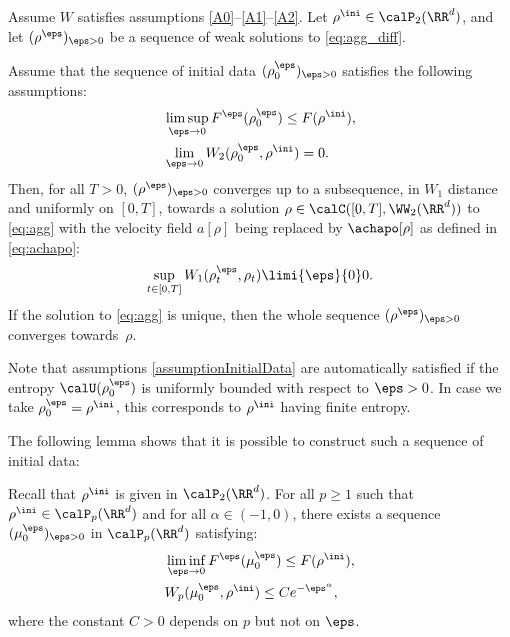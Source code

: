 \begin{theorem}\label{thm:cvLipschitz}
Assume $W$ satisfies assumptions \eqref{A0}--\eqref{A1}--\eqref{A2}. Let $\rho^{\ini} \in \calP_2(\RR^d)$, and let $(\rho^\eps)_{\eps > 0}$ be a sequence of weak solutions to \eqref{eq:agg_diff}.

Assume that the sequence of initial data $(\rho_0^\eps)_{\eps > 0}$ satisfies the following assumptions:%
\begin{subequations}\label{assumptionInitialData}
\begin{align}
& \limsup_{\eps \to 0} F^\eps(\rho_0^\eps) \leq F(\rho^{\ini}), \label{assumptionInitialData:1} \\
& \lim_{\eps \to 0} W_2(\rho_0^\eps,\rho^{\ini}) = 0. \label{assumptionInitialData:4}
\end{align}
\end{subequations}
Then, for all $T>0$, $(\rho^\eps)_{\eps > 0}$ converges up to a subsequence, in $W_1$ distance and uniformly on $[0,T]$, towards a solution $\rho \in \calC([0,T], \WW _2(\RR^d))$ to \eqref{eq:agg} with the velocity field $a[\rho]$ being replaced by $\achapo[\rho]$ as defined in \eqref{eq:achapo}:
\[
\sup_{t \in [0,T]} W_1(\rho_t^\eps, \rho_t) \limi{\eps}{0} 0.
\]
If the solution to \eqref{eq:agg} is unique, then the whole sequence $(\rho^\eps)_{\eps > 0}$ converges towards~$\rho$.
\end{theorem}
\begin{remark}
Note that assumptions \eqref{assumptionInitialData} are automatically satisfied if the entropy $\calU(\rho_0^\eps)$ is uniformly bounded with respect to $\eps>0$. In case we take $\rho_0^\eps = \rho^{\ini}$, this corresponds to $\rho^{\ini}$ having finite entropy.
\end{remark}
The following lemma shows that it is possible to construct such a sequence of initial data:
\begin{lemma}\label{lemma:initialData}
Recall that $\rho^{\ini}$ is given in $\calP_2(\RR^d)$. For all $p \geq 1$ such that $\rho^{\ini} \in \calP_p(\RR^d)$ and for all $\alpha \in (-1,0)$, there exists a sequence $(\mu_0^\eps)_{\eps > 0}$ in $\calP_p(\RR^d)$ satisfying:
\begin{subequations}\label{smoothedInitialData}
\begin{align}
& \liminf_{\eps \to 0} F^\eps(\mu_0^\eps) \leq F(\rho^{\ini}), \label{smoothedInitialData:1} \\
& W_p(\mu_0^\eps,\rho^{\ini}) \leq Ce^{-\eps^\alpha},\label{smoothedInitialData:4}
\end{align}
\end{subequations}
where the constant $C>0$ depends on $p$ but not on $\eps$.
\end{lemma}
